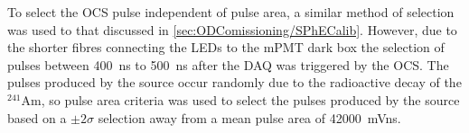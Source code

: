 To select the OCS pulse independent of pulse area, a similar method of selection was used to that discussed in \autoref{sec:ODComissioning/SPhECalib}. However, due to the shorter fibres connecting the LEDs to the mPMT dark box the selection of pulses between 400~ns to 500~ns after the DAQ was triggered by the OCS. The pulses produced by the source occur randomly due to the radioactive decay of the $^{241}\text{Am}$, so pulse area criteria was used to select the pulses produced by the source based on a $\pm2\sigma$ selection away from a mean pulse area of 42000~mVns.

